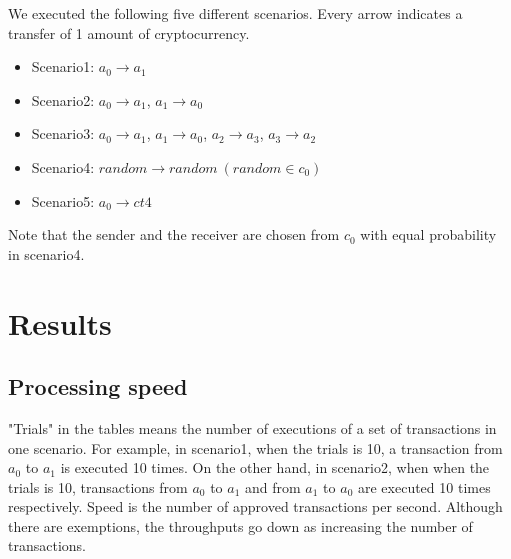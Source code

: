 \documentclass[a4paper, oneside]{discothesis}
\begin{document}
We executed the following five different scenarios.
Every arrow indicates a transfer of 1 amount of cryptocurrency.
\begin{itemize}
    \item Scenario1: $a_0 \rightarrow a_1$
    \item Scenario2: $a_0 \rightarrow a_1$, $a_1 \rightarrow a_0$
    \item Scenario3: $a_0 \rightarrow a_1$, $a_1 \rightarrow a_0$, $a_2 \rightarrow a_3$, $a_3 \rightarrow a_2$
    \item Scenario4: $random \rightarrow random~(random \in c_0)$
    \item Scenario5: $a_0 \rightarrow ct4$
\end{itemize}
Note that the sender and the receiver are chosen from $c_0$ with equal probability in scenario4.

\section{Results}

\subsection{Processing speed}
"Trials" in the tables means the number of executions of a set of transactions in one scenario.
For example, in scenario1, when the trials is 10, a transaction from $a_0$ to $a_1$
is executed 10 times.
On the other hand, in scenario2, when when the trials is 10,
transactions from $a_0$ to $a_1$ and from $a_1$ to $a_0$ are executed 10 times respectively.
Speed is the number of approved transactions per second.
Although there are exemptions, the throughputs go down as increasing the number of transactions.
\end{document}
